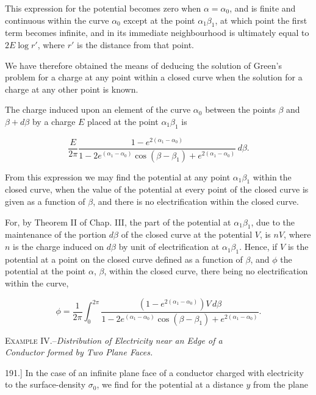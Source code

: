 \documentclass[11pt,a4paper]{article}
\begin{document}
This expression for the potential becomes zero when $\alpha=\alpha_0$, and is finite and continuous within the curve $\alpha_0$ except at the point $\alpha_1\beta_1$, at which point the first term becomes infinite, and in its immediate neighbourhood is ultimately equal to $2E\log r'$, where $r'$ is the distance from that point.

We have therefore obtained the means of deducing the solution of Green's problem for a charge at any point within a closed curve when the solution for a charge at any other point is known.

The charge induced upon an element of the curve $\alpha_0$ between the points $\beta$ and $\beta+d\beta$ by a charge $E$ placed at the point $\alpha_1\beta_1$ is

\begin{equation}\tag{15}
\frac{E}{2\pi}
\frac{1-e^{2(\alpha_1-\alpha_0)}}
{1-2e^{(\alpha_1-\alpha_0)}\cos(\beta-\beta_1)+e^{2(\alpha_1-\alpha_0)}}\,d\beta.
\end{equation}

From this expression we may find the potential at any point $\alpha_1\beta_1$ within the closed curve, when the value of the potential at every point of the closed curve is given as a function of $\beta$, and there is no electrification within the closed curve.

For, by Theorem II of Chap. III, the part of the potential at $\alpha_1\beta_1$, due to the maintenance of the portion $d\beta$ of the closed curve at the potential $V$, is $nV$, where $n$ is the charge induced on $d\beta$ by unit of electrification at $\alpha_1\beta_1$. Hence, if $V$ is the potential at a point on the closed curve defined as a function of $\beta$, and $\phi$ the potential at the point $\alpha$, $\beta$, within the closed curve, there being no electrification within the curve,

\begin{equation}\tag{16}
\phi = \frac{1}{2\pi}\int_0^{2\pi}
\frac{\left(1-e^{2(\alpha_1-\alpha_0)}\right)V\,d\beta}
{1-2e^{(\alpha_1-\alpha_0)}\cos(\beta-\beta_1)+e^{2(\alpha_1-\alpha_0)}}.
\end{equation}

\begin{center}
\textsc{Example IV.}--\textit{Distribution of Electricity near an Edge of a}\\
\textit{Conductor formed by Two Plane Faces.}
\end{center}

191.] In the case of an infinite plane face of a conductor charged with electricity to the surface-density $\sigma_0$, we find for the potential at a distance $y$ from the plane
\end{document}
